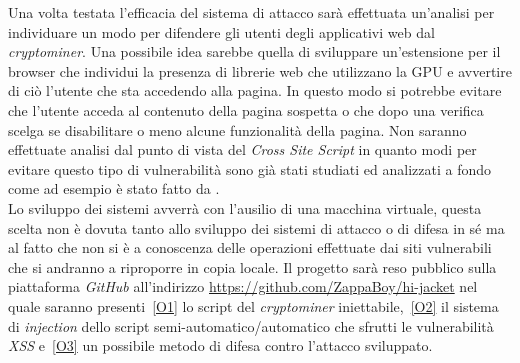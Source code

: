 \documentclass[
11pt, %
oneside, %
italian, %
onehalfspacing,%
headsepline, %
]{MastersDoctoralThesis} %
\newcommand\citen[1]{\citeauthor{#1} \citep{#1}}
\begin{document}
Una volta testata l'efficacia del sistema di attacco sarà effettuata un'analisi per individuare un modo per difendere gli utenti degli applicativi web dal \emph{cryptominer}. Una possibile idea sarebbe quella di sviluppare un'estensione per il browser che individui la presenza di librerie web che utilizzano la GPU e avvertire di ciò l'utente che sta accedendo alla pagina. In questo modo si potrebbe evitare che l'utente acceda al contenuto della pagina sospetta o che dopo una verifica scelga se disabilitare o meno alcune funzionalità della pagina. Non saranno effettuate analisi dal punto di vista del \emph{Cross Site Script} in quanto modi per evitare questo tipo di vulnerabilità sono già stati studiati ed analizzati a fondo come ad esempio è stato fatto da \citen{bisht2008xss}.\\
Lo sviluppo dei sistemi avverrà con l'ausilio di una macchina virtuale, questa scelta non è dovuta tanto allo sviluppo dei sistemi di attacco o di difesa in sé ma al fatto che non si è a conoscenza delle operazioni effettuate dai siti vulnerabili che si andranno a riproporre in copia locale. Il progetto sarà reso pubblico sulla piattaforma \emph{GitHub} all'indirizzo \url{https://github.com/ZappaBoy/hi-jacket} nel quale saranno presenti~\ref{O1} lo script del \emph{cryptominer} iniettabile,~\ref{O2} il sistema di \emph{injection} dello script semi-automatico/automatico che sfrutti le vulnerabilità \emph{XSS} e~\ref{O3} un possibile metodo di difesa contro l'attacco sviluppato.


\printbibliography\
\end{document}
